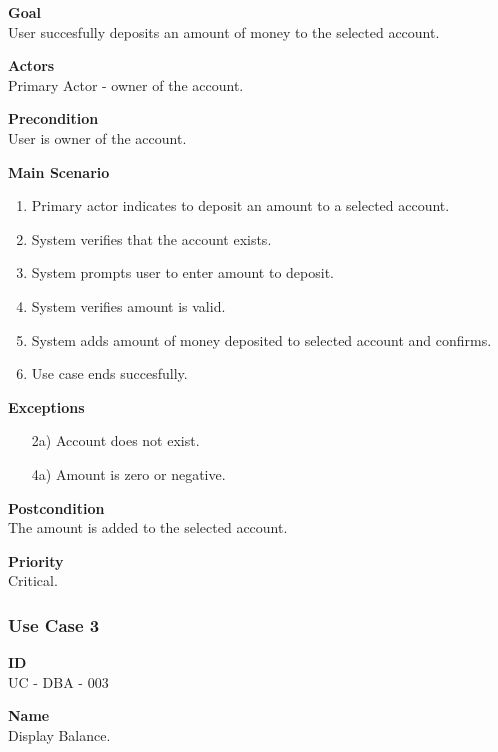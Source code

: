 \documentclass[12pt]{article}
\begin{document}
\noindent
{\bf Goal}\\
User succesfully deposits an amount of money to the selected account.

\noindent
{\bf Actors}\\
Primary Actor - owner of the account.

\noindent
{\bf Precondition}\\
User is owner of the account.

\noindent
{\bf Main Scenario}\\
\vspace*{-0.2in}
\begin{enumerate}
  \item Primary actor indicates to deposit an amount to a selected account.
  \item System verifies that the account exists.
  \item System prompts user to enter amount to deposit.
  \item System verifies amount is valid.
  \item System adds amount of money deposited to selected account and confirms.
  \item Use case ends succesfully.
\end{enumerate}

\noindent
    {\bf Exceptions}\\
    \vspace{-0.2in}
    \begin{itemize}
    \item[2a)] Account does not exist.
    \item[4a)] Amount is zero or negative.
    \end{itemize}

\noindent
{\bf Postcondition}\\
The amount is added to the selected account.

\noindent
{\bf Priority}\\
Critical.


\subsubsection{Use Case 3} \label{uc:3}

\noindent
{\bf ID}\\
UC - DBA - 003    

\noindent
{\bf Name}\\
Display Balance.
\end{document}
